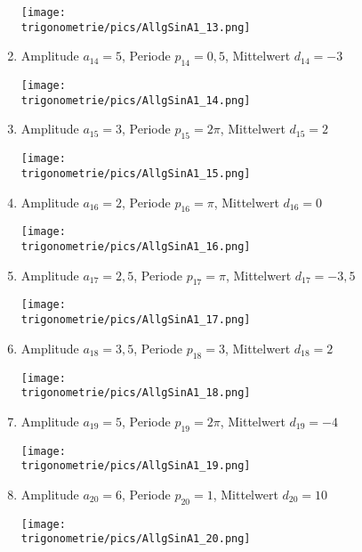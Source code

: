 \documentclass[a4paper,12pt, headsepline, ngerman]{scrartcl}
\theoremstyle{definition}
\begin{document}
\begin{Answer}[ref=allgSinCosA1]
\begin{enumerate}[label=\alph*)]
	 \begin{minipage}{\textwidth}
	 \texttt{[image: \\trigonometrie/pics/AllgSinA1\_13.png]}\\
	 \end{minipage}	 
	 \item Amplitude \(a_{14}=5\), Periode \(p_{14}=0,5\), Mittelwert \(d_{14}=-3\)\\
	 \begin{minipage}{\textwidth}
	 \texttt{[image: \\trigonometrie/pics/AllgSinA1\_14.png]}\\
	 \end{minipage}	 
	 \item Amplitude \(a_{15}=3\), Periode \(p_{15}=2\pi\), Mittelwert \(d_{15}=2\)\\
	 \begin{minipage}{\textwidth}
	 \texttt{[image: \\trigonometrie/pics/AllgSinA1\_15.png]}\\
	 \end{minipage}	 
	 \item Amplitude \(a_{16}=2\), Periode \(p_{16}=\pi\), Mittelwert \(d_{16}=0\)\\
	 \begin{minipage}{\textwidth}
	 \texttt{[image: \\trigonometrie/pics/AllgSinA1\_16.png]}\\
	 \end{minipage}	 \newpage
	 \item Amplitude \(a_{17}=2,5\), Periode \(p_{17}=\pi\), Mittelwert \(d_{17}=-3,5\)\\
	 \begin{minipage}{\textwidth}
	 \texttt{[image: \\trigonometrie/pics/AllgSinA1\_17.png]}\\
	 \end{minipage}	 
	 \item Amplitude \(a_{18}=3,5\), Periode \(p_{18}=3\), Mittelwert \(d_{18}=2\)\\
	 \begin{minipage}{\textwidth}
	 \texttt{[image: \\trigonometrie/pics/AllgSinA1\_18.png]}\\
	 \end{minipage}	 
	 \item Amplitude \(a_{19}=5\), Periode \(p_{19}=2\pi\), Mittelwert \(d_{19}=-4\)\\
	 \begin{minipage}{\textwidth}
	 \texttt{[image: \\trigonometrie/pics/AllgSinA1\_19.png]}\\
	 \end{minipage}	 
	 \item Amplitude \(a_{20}=6\), Periode \(p_{20}=1\), Mittelwert \(d_{20}=10\)\\
	 \begin{minipage}{\textwidth}
	 \texttt{[image: \\trigonometrie/pics/AllgSinA1\_20.png]}\\
	 \end{minipage}	 
\end{enumerate}
\end{Answer}
\end{document}
